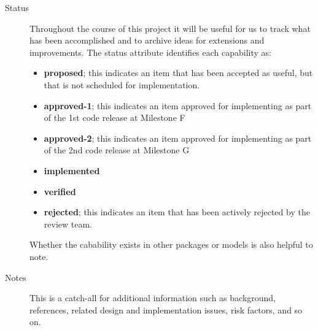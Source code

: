 \begin{description}
\item [Status] Throughout the course of this project it will be 
useful for us to track what has been accomplished and to archive 
ideas for extensions and improvements.  The status attribute identifies
each capability as:
\begin{itemize}
\item {\bf proposed}; this indicates an item that has been accepted as useful, but
that is not scheduled for implementation.
\item {\bf approved-1}; this indicates an item approved for implementing as part
of the 1st code release at Milestone F
\item {\bf approved-2}; this indicates an item approved for implementing as part 
of the 2nd code release at Milestone G
\item {\bf implemented}
\item {\bf verified}
\item {\bf rejected}; this indicates an item that has been actively rejected by
the review team.
\end{itemize}
Whether the cabability exists in other packages or models
is also helpful to note.

\item [Notes] This is a catch-all for additional information such
as background, references, related design and implementation issues, 
risk factors, and so on.

\end{description}


